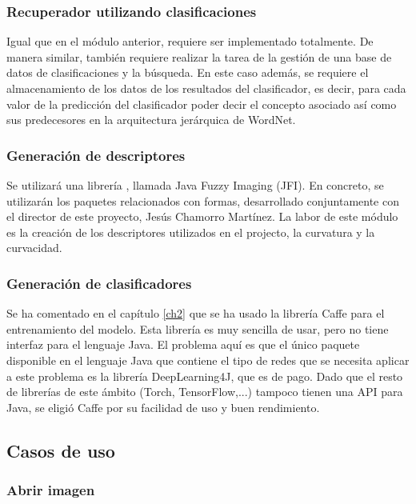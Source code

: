 \subsubsection{Recuperador utilizando clasificaciones}

Igual que en el módulo anterior, requiere ser implementado totalmente. De manera similar, también requiere realizar la tarea de la gestión de una base de datos de clasificaciones y la búsqueda. En este caso además, se requiere el almacenamiento de los datos de los resultados del clasificador, es decir, para cada valor de la predicción del clasificador poder decir el concepto asociado así como sus predecesores en la arquitectura jerárquica de WordNet.\\

\subsubsection{Generación de descriptores}

Se utilizará una librería , llamada Java Fuzzy Imaging (JFI). En concreto, se utilizarán los paquetes relacionados con formas, desarrollado conjuntamente con el director de este proyecto, Jesús Chamorro Martínez. La labor de este módulo es la creación de los descriptores utilizados en el projecto, la curvatura y la curvacidad.\\
  
\subsubsection{Generación de clasificadores}

Se ha comentado en el capítulo \ref{ch2} que se ha usado la librería Caffe para el entrenamiento del modelo. Esta librería es muy sencilla de usar, pero no tiene interfaz para el lenguaje Java. El problema aquí es que el único paquete disponible en el lenguaje Java que contiene el tipo de redes que se necesita aplicar a este problema es la librería DeepLearning4J, que es de pago. Dado que el resto de librerías de este ámbito (Torch, TensorFlow,...) tampoco tienen una API para Java, se eligió Caffe por su facilidad de uso y buen rendimiento.\\

\newpage
\subsection{Casos de uso}

\subsubsection{Abrir imagen}

